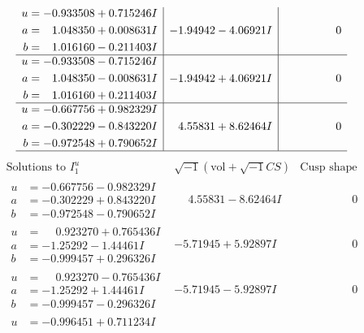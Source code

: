 \documentclass[1p]{elsarticle_modified}
\theoremstyle{definition}
\newcommand{\I}{\sqrt{-1}}
\begin{document}
$$\begin{array}{c|c|c}
\begin{aligned}
u &= -0.933508 + 0.715246 I \\
a &= \phantom{-}1.048350 + 0.008631 I \\
b &= \phantom{-}1.016160 - 0.211403 I\end{aligned}
 & -1.94942 - 4.06921 I & \phantom{-0.000000 } 0 \\ \hline\begin{aligned}
u &= -0.933508 - 0.715246 I \\
a &= \phantom{-}1.048350 - 0.008631 I \\
b &= \phantom{-}1.016160 + 0.211403 I\end{aligned}
 & -1.94942 + 4.06921 I & \phantom{-0.000000 } 0 \\ \hline\begin{aligned}
u &= -0.667756 + 0.982329 I \\
a &= -0.302229 - 0.843220 I \\
b &= -0.972548 + 0.790652 I\end{aligned}
 & \phantom{-}4.55831 + 8.62464 I & \phantom{-0.000000 } 0\\
 \hline 
 \end{array}$$\newpage$$\begin{array}{c|c|c}  
\text{Solutions to }I^u_{1}& \I (\text{vol} + \sqrt{-1}CS) & \text{Cusp shape}\\
 \hline 
\begin{aligned}
u &= -0.667756 - 0.982329 I \\
a &= -0.302229 + 0.843220 I \\
b &= -0.972548 - 0.790652 I\end{aligned}
 & \phantom{-}4.55831 - 8.62464 I & \phantom{-0.000000 } 0 \\ \hline\begin{aligned}
u &= \phantom{-}0.923270 + 0.765436 I \\
a &= -1.25292 - 1.44461 I \\
b &= -0.999457 + 0.296326 I\end{aligned}
 & -5.71945 + 5.92897 I & \phantom{-0.000000 } 0 \\ \hline\begin{aligned}
u &= \phantom{-}0.923270 - 0.765436 I \\
a &= -1.25292 + 1.44461 I \\
b &= -0.999457 - 0.296326 I\end{aligned}
 & -5.71945 - 5.92897 I & \phantom{-0.000000 } 0 \\ \hline\begin{aligned}
u &= -0.996451 + 0.711234 I \\

\end{aligned}
\end{array}$$
\end{document}
